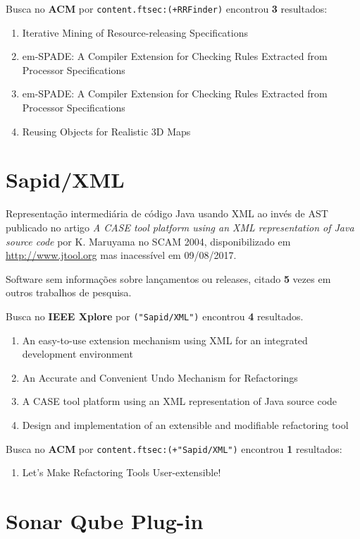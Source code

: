 Busca no {\bf ACM} por
\texttt{content.ftsec:(+RRFinder)}
encontrou {\bf 3}
resultados:

\begin{enumerate}
\item Iterative Mining of Resource-releasing Specifications
\item em-SPADE: A Compiler Extension for Checking Rules Extracted from Processor Specifications
\item em-SPADE: A Compiler Extension for Checking Rules Extracted from Processor Specifications
\item Reusing Objects for Realistic 3D Maps
\end{enumerate}

\section{Sapid/XML}

Representação intermediária de código Java usando XML ao invés de AST
publicado no artigo {\it A CASE tool platform using an XML representation of Java source code}
por K. Maruyama
no SCAM 2004,
disponibilizado em \url{http://www.jtool.org}
mas inacessível em 09/08/2017.

Software sem informações sobre lançamentos ou releases,
citado {\bf 5} vezes em outros trabalhos de pesquisa.

Busca no {\bf IEEE Xplore} por
\texttt{("Sapid/XML")}
encontrou {\bf 4}
resultados.

\begin{enumerate}
\item An easy-to-use extension mechanism using XML for an integrated development environment
\item An Accurate and Convenient Undo Mechanism for Refactorings
\item A CASE tool platform using an XML representation of Java source code
\item Design and implementation of an extensible and modifiable refactoring tool
\end{enumerate}

Busca no {\bf ACM} por
\texttt{content.ftsec:(+"Sapid/XML")}
encontrou {\bf 1}
resultados:

\begin{enumerate}
\item Let's Make Refactoring Tools User-extensible!
\end{enumerate}

\section{Sonar Qube Plug-in}

